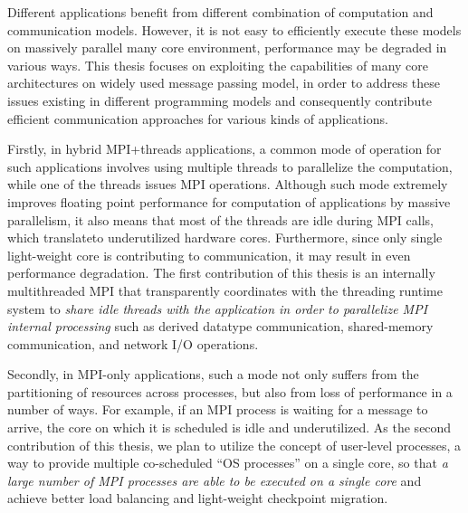 Different applications benefit from different combination of computation and 
communication models. However, it is not easy to efficiently execute these models
on massively parallel many core environment, performance may be degraded in various
ways. This thesis focuses on exploiting the capabilities of many core architectures
on widely used message passing model, in order to address these issues existing 
in different programming models and consequently contribute efficient communication 
approaches for various kinds of applications. 

Firstly, in hybrid MPI+threads applications, a common mode of operation for such 
applications involves using multiple threads to parallelize the computation, 
while one of the threads issues MPI operations. Although such mode extremely 
improves floating point performance for computation of applications by massive 
parallelism, it also means that most of the threads are idle during MPI calls, 
which translateto underutilized hardware cores. Furthermore, since only single 
light-weight core is contributing to communication, it may result in even 
performance degradation. The first contribution of this thesis is an internally multithreaded 
MPI that transparently coordinates with the threading runtime system to \textit{share
idle threads with the application in order to parallelize MPI internal 
processing} such as derived datatype communication, shared-memory communication, 
and network I/O operations. 

Secondly, in MPI-only applications, such a mode not only suffers from the partitioning 
of resources across processes, but also from loss of performance in a number 
of ways. For example, if an MPI process is waiting for a message to arrive, 
the core on which it is scheduled is idle and underutilized. As the second 
contribution of this thesis, we plan to utilize the concept of user-level 
processes, a way to provide multiple co-scheduled ``OS processes'' on a 
single core, so that \textit{a large number of MPI processes are able 
to be executed on a single core} and achieve better load balancing and 
light-weight checkpoint migration.


